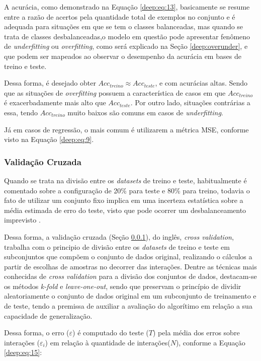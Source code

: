 A acurácia, como demonstrado na Equação \ref{deep:eq:13}, basicamente se resume entre a razão de acertos pela quantidade total de exemplos no conjunto e é adequada para situações em que se tem o classes balanceadas, mas quando se trata de classes desbalanceadas,o modelo em questão pode apresentar fenômeno de \textit{underfitting} ou \textit{overfitting}, como será explicado na Seção \ref{deep:overunder}, e que podem ser mapeados ao observar o desempenho da acurácia em bases de treino e teste.

Dessa forma, é desejado obter $Acc_{treino} \approx Acc_{teste}$, e com  acurácias altas. Sendo que as situações de \textit{overfitting} possuem a característica de casos em que $Acc_{treino}$ é exacerbadamente mais alto que $Acc_{teste}$. Por outro lado, situações contrárias a essa, tendo $Acc_{treino}$ muito baixos são comuns em casos de \textit{underfitting}.

Já em casos de regressão, o mais comum é utilizarem a métrica MSE, conforme visto na Equação \ref{deep:eq:9}.


\subsubsection{Validação Cruzada}
\label{deep:cross}

Quando se trata na divisão entre os \textit{datasets} de treino e teste, habitualmente é comentado sobre a configuração de 20\% para teste e 80\% para treino, todavia o fato de utilizar um conjunto fixo implica em uma incerteza estatística sobre a média estimada de erro do teste, visto que pode ocorrer um desbalanceamento imprevisto \citep{Goodfellow2016}.

Dessa forma, a validação cruzada (Seção \ref{deep:cross}), do inglês, \textit{cross validation}, trabalha com o principio de divisão entre os \textit{datasets} de treino e teste em subconjuntos que compõem o conjunto de dados original, realizando o cálculos a partir de escolhas de amostras no decorrer das interações. Dentre as técnicas mais conhecidas de \textit{cross validation} para a divisão dos conjuntos de dados, destacam-se os métodos \textit{k-fold} e \textit{leave-one-out}, sendo que preservam o princípio de dividir aleatoriamente o conjunto de dados original em um subconjunto de treinamento e de teste, tendo a premissa de auxiliar a avaliação do algorítimo em relação a sua capacidade de generalização.

Dessa forma, o erro ($\varepsilon$) é computado do teste ($T$) pela média dos erros sobre interações ($\varepsilon_i$) em relação à quantidade de interações($N$), conforme a Equação \ref{deep:eq:15}:

